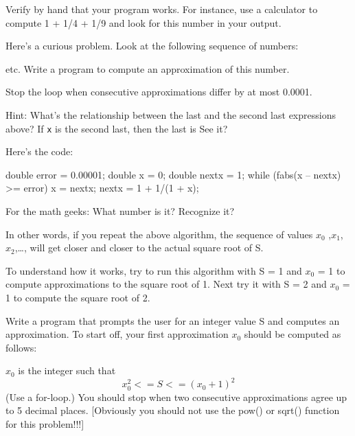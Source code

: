 Verify by hand that your program works. For instance, use a calculator
to compute 1 + 1/4 + 1/9 and look for this number in your output.

Here's a curious problem. Look at the following sequence
of numbers:


etc. Write a program to compute an approximation of this number.

Stop the loop when consecutive approximations differ by at most 0.0001.

Hint: What's the relationship between the last and the
second last expressions above? If \texttt{x} is the second last, then the
last is
See it?

Here's the code:
\begin{console}
double error = 0.00001;
double x = 0;
double nextx = 1;
while (fabs(x -- nextx) >= error)
{     
      x = nextx;
      nextx = 1 + 1/(1 + x);
}
\end{console}

For the math geeks: What number is it? Recognize it?

In other words, if you repeat the above algorithm, the sequence of
values $x_0$ ,$x_1$, $x_2$,\ldots, will get closer and closer to the actual square root of S.

To understand how it works, try to run this algorithm with S = 1 and
$x_0$ = 1 to compute approximations to the square root of 1. Next try it with S = 2 and $x_0$ = 1 to compute the square root of 2.

Write a program that prompts the user for an integer value S and computes an approximation. To start off, your first approximation $x_0$ should be computed as follows:

$x_0$ is the integer such that
\[x_0^2 <= S <= (x_0 + 1)^2\]
(Use a for-loop.) You should stop when two consecutive approximations
agree up to 5 decimal places. [Obviously you should not use the pow()
or sqrt() function for this problem!!!]

